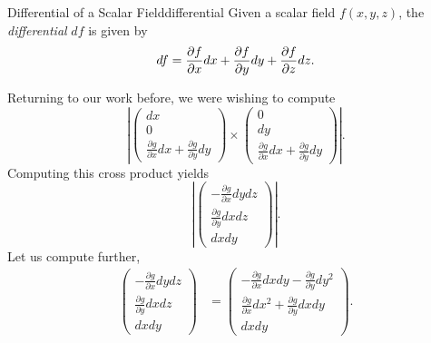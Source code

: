                                       \begin{df}{Differential of a Scalar Field}{differential}
                                      	Given a scalar field $f(x,y,z)$, the \emph{differential} $df$ is given by
                                      	\[
                                      	df = \frac{\partial f}{\partial x}dx + \frac{\partial f}{\partial y} dy + \frac{\partial f}{\partial z} dz.
                                      	\]
                                      \end{df}

                                     Returning to our work before, we were wishing to compute
                                     \[
                                     \left| \begin{pmatrix} dx \\ 0 \\  \frac{\partial g}{\partial x}dx + \frac{\partial g}{\partial y}dy \end{pmatrix} \times \begin{pmatrix} 0 \\ dy \\  \frac{\partial g}{\partial x}dx + \frac{\partial g}{\partial y}dy \end{pmatrix}\right|.
                                     \]
                                     Computing this cross product yields
                                     \[
                                     \left| \begin{pmatrix} -\frac{\partial g}{\partial x} dydz \\ \frac{\partial g}{\partial y}dxdz \\ dxdy \end{pmatrix} \right|.
                                     \]
                                     Let us compute further,
                                    \begin{align*}
                                     \begin{pmatrix} -\frac{\partial g}{\partial x} dydz \\ \frac{\partial g}{\partial y}dxdz \\ dxdy \end{pmatrix} &= \begin{pmatrix} -\frac{\partial g}{\partial x}dxdy - \frac{\partial g}{\partial y} dy^2 \\ \frac{\partial g}{\partial x}dx^2+\frac{\partial g}{\partial y} dxdy \\ dxdy \end{pmatrix}.
                                    \end{align*}
